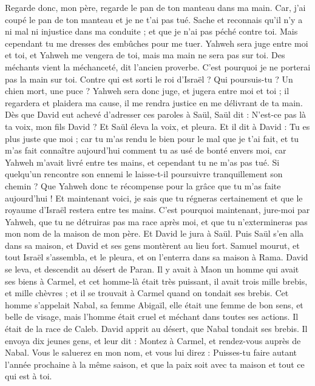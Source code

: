 \begin{multicols}{2}
Regarde donc, mon père, regarde le pan de ton manteau dans ma main. Car, j’ai coupé le pan de ton manteau et je ne t'ai pas tué. Sache et reconnais qu'il n'y a ni mal ni injustice dans ma conduite ; et que je n'ai pas péché contre toi. Mais cependant tu me dresses des embûches pour me tuer.
Yahweh sera juge entre moi et toi, et Yahweh me vengera de toi, mais ma main ne sera pas sur toi.
Des méchants vient la méchanceté, dit l’ancien proverbe. C'est pourquoi je ne porterai pas la main sur toi.
Contre qui est sorti le roi d'Israël ? Qui poursuis-tu ? Un chien mort, une puce ?
Yahweh sera donc juge, et jugera entre moi et toi ; il regardera et plaidera ma cause, il me rendra justice en me délivrant de ta main.
Dès que David eut achevé d’adresser ces paroles à Saül, Saül dit : N'est-ce pas là ta voix, mon fils David ? Et Saül éleva la voix, et pleura.
Et il dit à David : Tu es plus juste que moi ; car tu m'as rendu le bien pour le mal que je t'ai fait,
et tu m'as fait connaître aujourd'hui comment tu as usé de bonté envers moi, car Yahweh m'avait livré entre tes mains, et cependant tu ne m'as pas tué.
Si quelqu’un rencontre son ennemi le laisse-t-il poursuivre tranquillement son chemin ? Que Yahweh donc te récompense pour la grâce que tu m'as faite aujourd'hui !
Et maintenant voici, je sais que tu régneras certainement et que le royaume d'Israël restera entre tes mains.
C'est pourquoi maintenant, jure-moi par Yahweh, que tu ne détruiras pas ma race après moi, et que tu n'extermineras pas mon nom de la maison de mon père.
Et David le jura à Saül. Puis Saül s'en alla dans sa maison, et David et ses gens montèrent au lieu fort.
\VerseOne{}Samuel mourut, et tout Israël s'assembla, et le pleura, et on l'enterra dans sa maison à Rama. David se leva, et descendit au désert de Paran.
Il y avait à Maon un homme qui avait ses biens à Carmel, et cet homme-là était très puissant, il avait trois mille brebis, et mille chèvres ; et il se trouvait à Carmel quand on tondait ses brebis.
Cet homme s’appelait Nabal, sa femme Abigaïl, elle était une femme de bon sens, et belle de visage, mais l’homme était cruel et méchant dans toutes ses actions. Il était de la race de Caleb.
David apprit au désert, que Nabal tondait ses brebis.
Il envoya dix jeunes gens, et leur dit : Montez à Carmel, et rendez-vous auprès de Nabal. Vous le saluerez en mon nom,
et vous lui direz : Puisses-tu faire autant l’année prochaine à la même saison, et que la paix soit avec ta maison et tout ce qui est à toi.

\end{multicols}
